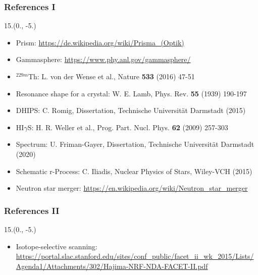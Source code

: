 \documentclass{beamer}
\begin{document}
\begin{frame}
    \frametitle{References I}
    \begin{textblock}{15.}(0., -5.)
    \begin{itemize}
        \item Prism: \url{https://de.wikipedia.org/wiki/Prisma_(Optik)}
        \item Gammasphere: \url{https://www.phy.anl.gov/gammasphere/}
        \item $^{229m}$Th: L. von der Wense et al., Nature \textbf{533} (2016) 47-51
        \item Resonance shape for a crystal: W. E. Lamb, Phys. Rev. \textbf{55} (1939) 190-197
        \item DHIPS: C. Romig, Dissertation, Technische Universit\"at Darmstadt (2015)
        \item HI$\gamma$S: H. R. Weller et al., Prog. Part. Nucl. Phys. \textbf{62} (2009) 257-303
        \item Spectrum: U. Friman-Gayer, Dissertation, Technische Universit\"at Darmstadt (2020)
        \item Schematic r-Process: C. Iliadis, Nuclear Physics of Stars, Wiley-VCH (2015)
        \item Neutron star merger: \url{https://en.wikipedia.org/wiki/Neutron_star_merger}
    \end{itemize}
    \end{textblock}
\end{frame}

\begin{frame}
    \frametitle{References II}
    \begin{textblock}{15.}(0., -5.)
    \begin{itemize}
        \item Isotope-selective scanning: \url{https://portal.slac.stanford.edu/sites/conf_public/facet_ii_wk_2015/Lists/Agenda1/Attachments/302/Hajima-NRF-NDA-FACET-II.pdf}
    \end{itemize}
    \end{textblock}
\end{frame}
\end{document}
